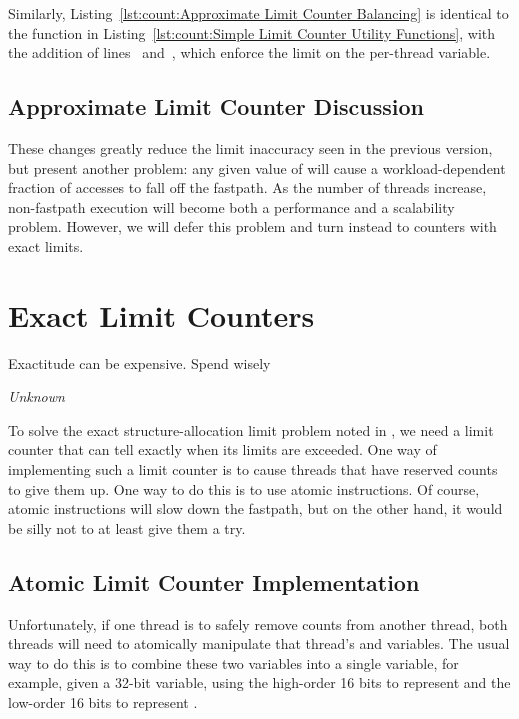 \begin{lineref}
Similarly,
Listing~\ref{lst:count:Approximate Limit Counter Balancing}
is identical to the  function in
Listing~\ref{lst:count:Simple Limit Counter Utility Functions},
with the addition of
lines~ and~, which enforce the
 limit on the per-thread  variable.
\end{lineref}

\subsection{Approximate Limit Counter Discussion}

These changes greatly reduce the limit inaccuracy seen in the previous version,
but present another problem: any given value of 
will cause a workload-dependent fraction of accesses to fall off the
fastpath.
As the number of threads increase, non-fastpath execution will become both
a performance and a scalability problem.
However, we will defer this problem and turn instead to counters
with exact limits.

\section{Exact Limit Counters}
\label{sec:count:Exact Limit Counters}
%
\epigraph{Exactitude can be expensive.  Spend wisely}{\emph{Unknown}}

To solve the exact structure-allocation limit problem noted in
\QuickQuizRef{\QcountQexactcnt},
we need a limit counter that can tell exactly when its limits are
exceeded.
One way of implementing such a limit counter is to
cause threads that have reserved counts to give them up.
One way to do this is to use atomic instructions.
Of course, atomic instructions will slow down the fastpath, but on the
other hand, it would be silly not to at least give them a try.

\subsection{Atomic Limit Counter Implementation}
\label{sec:count:Atomic Limit Counter Implementation}

Unfortunately,
if one thread is to safely remove counts from another thread,
both threads will need to atomically manipulate that thread's
 and  variables.
The usual way to do this is to combine these two variables into a
single variable,
for example, given a 32-bit variable, using the high-order 16 bits to
represent  and the low-order 16 bits to represent
.

